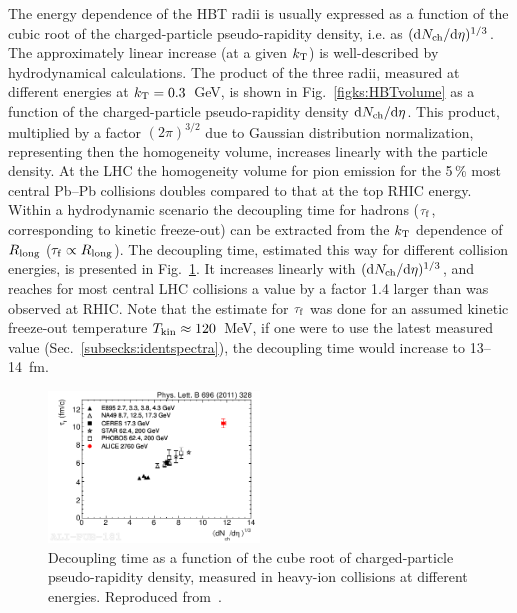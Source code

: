 The energy dependence of the HBT radii is usually expressed as a function of the cubic root of the charged-particle pseudo-rapidity density, i.e. as $({\rm d}N_{\rm ch}/{\rm d}\eta)^{1/3}$. The approximately linear increase (at a given $k_{\rm T}$) is well-described by hydrodynamical calculations. The product of the three radii, measured at different energies at $k_{\rm T} = 0.3$~GeV, is shown in Fig.~\ref{figks:HBTvolume} as a function of the charged-particle pseudo-rapidity density ${\rm d}N_{\rm ch}/{\rm d}\eta$. This product, multiplied by a factor $(2\pi)^{3/2}$ due to Gaussian distribution normalization, representing then the homogeneity volume, increases linearly with the particle density. At the LHC the homogeneity volume for pion emission for the 5\,\% most central Pb--Pb collisions doubles compared to that at the top RHIC energy. Within a hydrodynamic scenario the decoupling time for hadrons ($\tau_{\rm f}$, corresponding to kinetic freeze-out) can be extracted from the $k_{\rm T}$ dependence of $R_{\rm long}$ ($\tau_{\rm f} \propto R_{\rm long}$). The decoupling time, estimated this way for different collision energies, is presented in Fig.~\ref{figks:HBTtime}. It increases linearly with $({\rm d}N_{\rm ch}/{\rm d}\eta)^{1/3}$, and reaches for most central LHC collisions a value by a factor 1.4 larger than was observed at RHIC. Note that the estimate for $\tau_{\rm f}$ was done for an assumed kinetic freeze-out temperature $T_{\rm kin} \approx 120$~MeV, if one were to use the latest measured value (Sec.~\ref{subsecks:identspectra}), the decoupling time would increase to 13--14~fm.

\begin{figure}
\centering
\includegraphics[width=0.5\textwidth]{ksfigures/HBTDecouplTime.pdf}
\caption{Decoupling time as a function of the cube root of charged-particle pseudo-rapidity density, measured in heavy-ion collisions at different energies. Reproduced from~\cite{}.}
\label{figks:HBTtime}
\end{figure}

